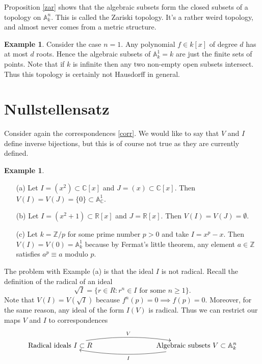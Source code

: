 \documentclass [12pt,oneside,a4paper,mathscr]{amsart}
\theoremstyle{definition}
\newtheorem{example}[thm]{Example}
\newcommand {\A}{\mathbb A}
\newcommand {\C}{\mathbb C}
\renewcommand{\geq}{\geqslant}
\newcommand{\R}{\mathbb{R}}
\newcommand{\Z}{\mathbb Z}
\begin{document}
Proposition \ref{zar} shows that the algebraic subsets form the closed subsets of a topology on $\A^n_k$. This is called the 
Zariski topology. It's a rather weird topology, and almost never comes from a  metric structure.


\begin{example}
Consider the case $n=1$. Any polynomial $f\in k[x]$ of degree $d$ has at most $d$ roots. 
Hence the algebraic subsets of $\A^1_k = k$ are just the finite sets of points. Note that if $k$ is infinite then any two non-empty open subsets intersect. Thus this topology is certainly not Hausdorff in general.
\end{example}









\section{Nullstellensatz}


Consider again the correspondences \eqref{corr}. We would like to say that $V$ and $I$ define inverse bijections, but this is of course not true as they are currently defined.
\begin{example}
\begin{itemize}
\item[(a)] Let $I=(x^2)\subset \C[x]$ and $J=(x) \subset \C[x]$. Then $V(I)=V(J)=\{0\}\subset \A^1_\C$.
\smallskip
\item[(b)] Let $I=(x^2+1)\subset \R[x]$ and $J=\R[x]$. Then $V(I)=V(J)=\emptyset$.
\smallskip
\item[(c)] Let $k=\Z/p$ for some prime number $p>0$ and take $I=x^p-x$. Then  $V(I)=V(0)=\A^1_k$ because by Fermat's little theorem, any element $a\in \Z$ satisfies $a^p\equiv a$ modulo $p$.
\end{itemize}
\end{example}

The problem with Example (a) is that the ideal $I$ is not radical. Recall the definition of the  radical of an ideal
\[\sqrt{I}=\{r\in R: r^n\in I \text{ for some }n\geq 1\}.\]
Note that $V(I)=V(\sqrt{I})$ because $f^n(p)=0\implies f(p)=0$. Moreover, for the same reason, any ideal of the form $I(V)$ is radical. Thus we can restrict our maps $V$ and $I$ to correspondences
\[\xymatrix{ {\text{Radical ideals }I\subset R} \ar@/^1pc/[rrr]^{V} &&& {\text{Algebraic subsets }V\subset \A^n_k} \ar@/^1pc/[lll]^{I}}\]
\end{document}
